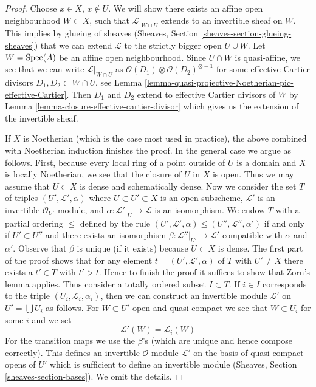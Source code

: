 \begin{proof}
Choose $x \in X$, $x \not \in U$. We will show there exists an
affine open neighbourhood $W \subset X$, such that $\mathcal{L}|_{W \cap U}$
extends to an invertible sheaf on $W$. This implies by glueing of
sheaves (Sheaves, Section \ref{sheaves-section-glueing-sheaves})
that we can extend $\mathcal{L}$ to the strictly bigger open $U \cup W$.
Let $W = \mathop{\mathrm{Spec}}(A)$ be an affine open neighbourhood.
Since $U \cap W$ is quasi-affine, we see that we can write
$\mathcal{L}|_{W \cap U}$ as
$\mathcal{O}(D_1) \otimes \mathcal{O}(D_2)^{\otimes -1}$ for some
effective Cartier divisors $D_1, D_2 \subset W \cap U$, see
Lemma \ref{lemma-quasi-projective-Noetherian-pic-effective-Cartier}.
Then $D_1$ and $D_2$ extend to effective Cartier divisors of
$W$ by Lemma \ref{lemma-closure-effective-cartier-divisor}
which gives us the extension of the invertible sheaf.

\medskip\noindent
If $X$ is Noetherian (which is the case most used in practice), the above
combined with Noetherian induction finishes the proof. In the general case
we argue as follows. First, because every local ring of a point outside
of $U$ is a domain and $X$ is locally Noetherian, we see that the closure
of $U$ in $X$ is open. Thus we may assume that $U \subset X$ is dense
and schematically dense.
Now we consider the set $T$ of triples $(U', \mathcal{L}', \alpha)$
where $U \subset U' \subset X$ is an open subscheme, $\mathcal{L}'$
is an invertible $\mathcal{O}_{U'}$-module, and
$\alpha : \mathcal{L}'|_U \to \mathcal{L}$ is an isomorphism.
We endow $T$ with a partial ordering $\leq$ defined by the rule
$(U', \mathcal{L}', \alpha) \leq (U'', \mathcal{L}'', \alpha')$
if and only if $U' \subset U''$ and there exists an isomorphism
$\beta : \mathcal{L}''|_{U'} \to \mathcal{L}'$ compatible with
$\alpha$ and $\alpha'$. Observe that $\beta$ is unique (if it exists)
because $U \subset X$ is dense. The first part of the proof shows that
for any element $t = (U', \mathcal{L}', \alpha)$ of $T$ with $U' \not = X$
there exists a $t' \in T$ with $t' > t$. Hence to finish the proof it
suffices to show that Zorn's lemma applies. Thus consider a
totally ordered subset $I \subset T$. If $i \in I$ corresponds to
the triple $(U_i, \mathcal{L}_i, \alpha_i)$, then we can construct
an invertible module $\mathcal{L}'$ on $U' = \bigcup U_i$ as follows.
For $W \subset U'$ open and quasi-compact we see that
$W \subset U_i$ for some $i$ and we set
$$
\mathcal{L}'(W) = \mathcal{L}_i(W)
$$
For the transition maps we use the $\beta$'s (which are unique and hence
compose correctly). This defines an invertible $\mathcal{O}$-module
$\mathcal{L}'$ on the basis of quasi-compact opens of $U'$ which is sufficient
to define an invertible module (Sheaves, Section \ref{sheaves-section-bases}).
We omit the details.
\end{proof}

